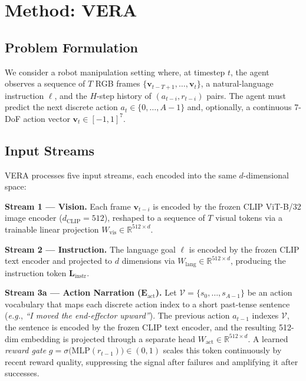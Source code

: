\documentclass{article}
\newcommand{\vera}{\textsc{VERA}}
\newcommand{\eact}{$\mathbf{E}_\text{act}$}
\newcommand{\eg}{\textit{e.g.}}
\begin{document}
\section{Method: \vera{}}
\label{sec:method}

\subsection{Problem Formulation}
We consider a robot manipulation setting where, at timestep $t$, the agent observes
a sequence of $T$ RGB frames $\{\mathbf{v}_{t-T+1},\ldots,\mathbf{v}_t\}$,
a natural-language instruction $\ell$, and the $H$-step history of
$(a_{t-i}, r_{t-i})$ pairs.
The agent must predict the next discrete action $a_t \in \{0,\ldots,A{-}1\}$ and,
optionally, a continuous 7-DoF action vector $\mathbf{v}_t \in [-1,1]^7$.

\subsection{Input Streams}
\vera{} processes five input streams, each encoded into the same $d$-dimensional space:

\vspace{2pt}\noindent\textbf{Stream 1 — Vision.}
Each frame $\mathbf{v}_{t-i}$ is encoded by the frozen CLIP ViT-B/32 image encoder
($d_\text{CLIP}=512$), reshaped to a sequence of $T$ visual tokens via a trainable
linear projection $W_\text{vis}\in\mathbb{R}^{512\times d}$.

\vspace{2pt}\noindent\textbf{Stream 2 — Instruction.}
The language goal $\ell$ is encoded by the frozen CLIP text encoder and projected
to $d$ dimensions via $W_\text{lang}\in\mathbb{R}^{512\times d}$, producing the
instruction token $\mathbf{L}_\text{instr}$.

\vspace{2pt}\noindent\textbf{Stream 3a — Action Narration (\eact{}).}
Let $\mathcal{V}=\{s_0,\ldots,s_{A-1}\}$ be an action vocabulary that maps each
discrete action index to a short past-tense sentence
(\eg, \textit{``I moved the end-effector upward''}).
The previous action $a_{t-1}$ indexes $\mathcal{V}$, the sentence is encoded by
the frozen CLIP text encoder, and the resulting 512-dim embedding is projected
through a separate head $W_\text{act}\in\mathbb{R}^{512\times d}$.
A learned \emph{reward gate}
$g = \sigma\!\bigl(\text{MLP}(r_{t-1})\bigr) \in (0,1)$
scales this token continuously by recent reward quality, suppressing the signal
after failures and amplifying it after successes.
\end{document}
